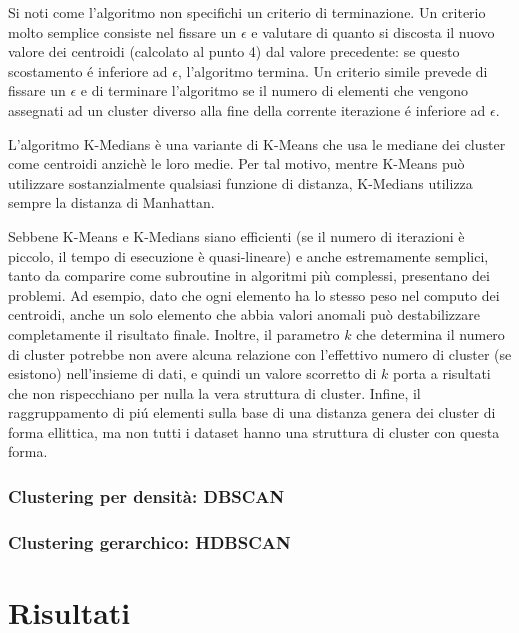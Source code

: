 \documentclass[12pt]{report}
\begin{document}
				Si noti come l'algoritmo non specifichi un criterio di terminazione. Un criterio
				molto semplice consiste nel fissare un $\epsilon$ e valutare di quanto
				si discosta il nuovo valore dei centroidi (calcolato al punto 4) dal
				valore precedente: se questo scostamento é inferiore ad $\epsilon$,
				l'algoritmo termina. Un criterio simile prevede di fissare un $\epsilon$
				e di terminare l'algoritmo se il numero di elementi che vengono assegnati
				ad un cluster diverso alla fine della corrente iterazione é inferiore ad
				$\epsilon$.

				L'algoritmo K-Medians è una variante di K-Means che usa le mediane dei
				cluster come centroidi anzichè le loro medie. Per tal motivo, mentre
				K-Means può utilizzare sostanzialmente qualsiasi funzione di distanza,
				K-Medians utilizza sempre la distanza di Manhattan.

				Sebbene K-Means e K-Medians siano efficienti (se il numero di
				iterazioni è piccolo, il tempo di esecuzione è quasi-lineare) e
				anche estremamente semplici, tanto da comparire come subroutine
				in algoritmi più complessi, presentano dei problemi. Ad esempio,
				dato che ogni elemento ha lo stesso peso nel computo dei centroidi,
				anche un solo elemento che abbia valori anomali può destabilizzare
				completamente il risultato finale. Inoltre, il parametro $k$ che
				determina il numero di cluster potrebbe non avere alcuna relazione
				con l'effettivo numero di cluster (se esistono) nell'insieme di
				dati, e quindi un valore scorretto di $k$ porta a risultati che
				non rispecchiano per nulla la vera struttura di cluster. Infine,
				il raggruppamento di piú elementi sulla base di una distanza genera
				dei cluster di forma ellittica, ma non tutti i dataset hanno una
				struttura di cluster con questa forma.

			\subsection{Clustering per densità: DBSCAN}

			\subsection{Clustering gerarchico: HDBSCAN}

	\chapter{Risultati}
\end{document}
